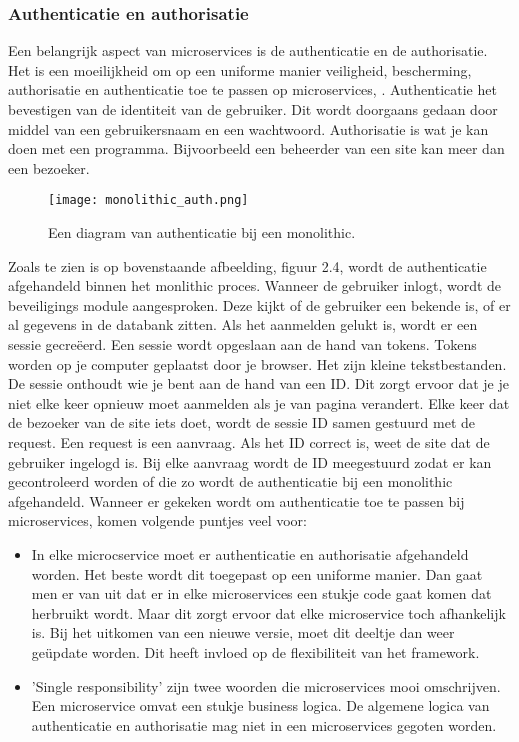 \subsubsection{Authenticatie en authorisatie}
Een belangrijk aspect van microservices is de authenticatie en de authorisatie.  Het is een moeilijkheid om op een uniforme manier veiligheid, bescherming, authorisatie en authenticatie toe te passen op microservices, \textcite{Ayoub2018}. Authenticatie het bevestigen van de identiteit van de gebruiker. Dit wordt doorgaans gedaan door middel van een gebruikersnaam en een wachtwoord. Authorisatie is wat je kan doen met een programma. Bijvoorbeeld een beheerder van een site kan meer dan een bezoeker. 
\begin{figure}[h]
	\texttt{[image: monolithic\_auth.png]}
	\centering
	\caption{Een diagram van authenticatie bij een monolithic. \textcite{Ayoub2018}}
\end{figure}
Zoals te zien is op bovenstaande afbeelding, figuur 2.4, wordt de authenticatie afgehandeld binnen het monlithic proces. Wanneer de gebruiker inlogt, wordt de beveiligings module aangesproken. Deze kijkt of de gebruiker een bekende is, of er al gegevens in de databank zitten. Als het aanmelden gelukt is, wordt er een sessie gecreëerd. Een sessie wordt opgeslaan aan de hand van tokens. Tokens worden op je computer geplaatst door je browser. Het zijn kleine tekstbestanden. De sessie onthoudt wie je bent aan de hand van een ID. Dit zorgt ervoor dat je je niet elke keer opnieuw moet aanmelden als je van pagina verandert.  Elke keer dat de bezoeker van de site iets doet, wordt de sessie ID samen gestuurd met de request. Een request is een aanvraag. Als het ID correct is,  weet de site dat de gebruiker ingelogd is. Bij elke aanvraag wordt de ID meegestuurd zodat er kan gecontroleerd worden of die zo wordt de authenticatie bij een monolithic afgehandeld.
Wanneer er gekeken wordt om authenticatie toe te passen bij microservices, komen volgende puntjes veel voor:
\begin{itemize}
	\item In elke microcservice moet er authenticatie en authorisatie afgehandeld worden. Het beste wordt dit toegepast op een uniforme manier. Dan gaat men er van uit dat er in elke microservices een stukje code gaat komen dat herbruikt wordt. Maar dit zorgt ervoor dat elke microservice toch afhankelijk is. Bij het uitkomen van een nieuwe  versie, moet dit deeltje dan  weer geüpdate worden. Dit heeft invloed op de flexibiliteit van het framework.
	\item 'Single responsibility' zijn twee woorden die microservices mooi omschrijven. Een microservice omvat een stukje business logica. De algemene logica van authenticatie en authorisatie mag niet in een microservices gegoten worden. 
\end{itemize}
